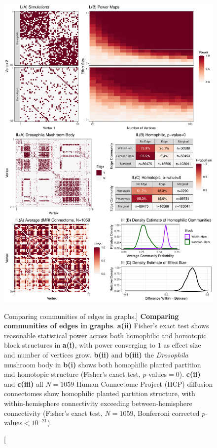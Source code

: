 \begin{figure}
    \centering
    \includegraphics[width=.9\linewidth]{figures/dnd/siem_figure.pdf}
    \caption
    [Comparing communities of edges in graphs.]
    {\textbf{Comparing communities of edges in graphs}. \textbf{a(ii)} Fisher's exact test shows reasonable statistical power across both homophilic and homotopic block structures in \textbf{a(i)}, with power converging to $1$ as effect size and number of vertices grow. \textbf{b(ii)} and \textbf{b(iii)} the \textit{Drosophila} mushroom body in \textbf{b(i)} shows both homophilic planted partition and homotopic structure (Fisher's exact test, $p$-values$=0$). \textbf{c(ii)} and \textbf{c(iii)} all $N=1059$ Human Connectome Project (HCP) diffusion connectomes show homophilic planted partition structure, with within-hemisphere connectivity exceeding between-hemisphere connectivity (Fisher's exact test, $N=1059$, Bonferroni corrected $p$-values$<10^{-21}$).}
    \label{fig:siem_uwt}
\end{figure}

